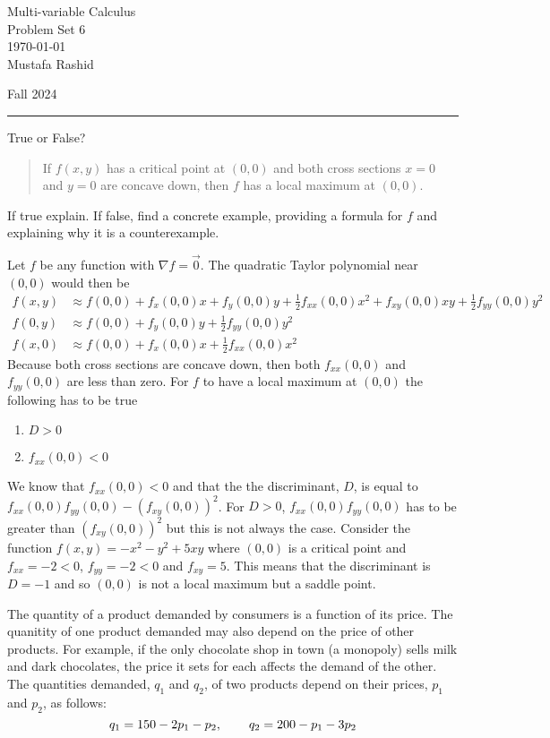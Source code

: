 \documentclass[12pt,letterpaper, onecolumn]{exam}
\begin{document}
	
	\begingroup  
	\centering
	\LARGE Multi-variable Calculus\\
	\LARGE Problem Set 6\\[0.5em]
	\large \today\\[0.5em]
	\large Mustafa Rashid\par
	\large Fall 2024\par
	\endgroup
	\rule{\textwidth}{0.4pt}
	\pointsdroppedatright
	\printanswers
	\renewcommand{\solutiontitle}{\noindent\textbf{Ans:}\enspace}  
	
	
	
	\begin{questions}
		
		\question True or False?
		\begin{quote}
			If $f(x,y)$ has a critical point at $(0,0)$ and both cross sections $x=0$ and $y=0$ are concave down, then $f$ has a local maximum at $(0,0)$.
		\end{quote}
		If true explain. If false, find a concrete example, providing a formula for $f$ and explaining why it is a counterexample.

		\begin{solution}
			Let $f$ be any function with $\nabla f=\vec{0}$. The quadratic Taylor polynomial near $(0,0)$ would then be 
			\begin{align*}
				f(x,y)&\approx f(0,0)+f_x(0,0)x+f_y(0,0)y+\frac{1}{2}f_{xx}(0,0)x^2+f_{xy}(0,0)xy+\frac{1}{2}f_{yy}(0,0)y^2\\
				f(0,y)&\approx f(0,0)+f_y(0,0)y+\frac{1}{2}f_{yy}(0,0)y^2\tag{Cross section where $x=0$}\\
				f(x,0)&\approx f(0,0)+f_x(0,0)x+\frac{1}{2}f_{xx}(0,0)x^2\tag{Cross section where $y=0$}
			\end{align*}
			Because both cross sections are concave down, then both $f_{xx}(0,0)$ and $f_{yy}(0,0)$ are less than zero. For $f$ to have a local maximum at $(0,0)$ the following has to be true
			\begin{enumerate}
				\item $D>0$
				\item $f_{xx}(0,0)<0$
			\end{enumerate}
			We know that $f_{xx}(0,0)<0$ and that the the discriminant, $D$, is equal to $f_{xx}(0,0)f_{yy}(0,0)-\left(f_{xy}(0,0)\right)^2$. For $D>0$, $f_{xx}(0,0)f_{yy}(0,0)$ has to be greater than $\left(f_{xy}(0,0)\right)^2$ but this is not always the case. Consider the function $f(x,y)=-x^2-y^2+5xy$ where $(0,0)$ is a critical point and $f_{xx}=-2<0$, $f_{yy}=-2<0$ and $f_{xy}=5$. This means that the discriminant is $D=-1$ and so $(0,0)$ is not a local maximum but a saddle point.
		\end{solution}
	\question The quantity of a product demanded by consumers is a function of its price. The quanitity of one product demanded may also depend on the price of other products. For example, if the only chocolate shop in town (a monopoly) sells milk and dark chocolates, the price it sets for each affects the demand of the other. The quantities demanded, $q_1$ and $q_2$, of two products depend on their prices, $p_1$ and $p_2$, as follows: 
	$$q_1=150-2p_1-p_2,\hspace*{0.75cm}q_2=200-p_1-3p_2$$
	\begin{parts}

\end{parts}
\end{questions}
\end{document}
